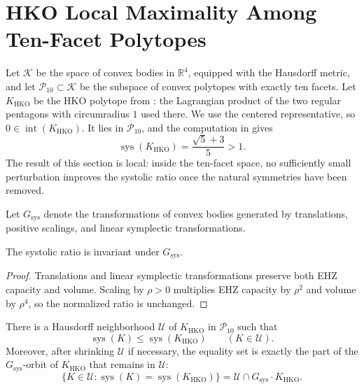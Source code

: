 \clearpage
\section[HKO Local Maximality]{HKO Local Maximality Among Ten-Facet Polytopes}
\label{sec:hko-local-maximum}

Let \(\mathcal K\) be the space of convex bodies in \(\mathbb R^4\), equipped
with the Hausdorff metric, and let \(\mathcal P_{10}\subset\mathcal K\) be the
subspace of convex polytopes with exactly ten facets. Let
\(K_{\mathrm{HKO}}\) be the HKO polytope from
\cite[Proposition~1.3]{HaimKislevOstrover2024}: the Lagrangian product of the
two regular pentagons with circumradius \(1\) used there. We use the centered
representative, so \(0\in\operatorname{int}(K_{\mathrm{HKO}})\). It lies in
\(\mathcal P_{10}\), and the computation in
\cite[Proof of Theorem~1.2]{HaimKislevOstrover2024} gives
\[
  \operatorname{sys}(K_{\mathrm{HKO}})
  =
  \frac{\sqrt{5}+3}{5}
  >1.
\]
The result of this section is local: inside the ten-facet space, no
sufficiently small perturbation improves the systolic ratio once the natural
symmetries have been removed.

\begin{definition}
\label{def:hko-systolic-ratio-symmetries}
Let \(G_{\operatorname{sys}}\) denote the transformations of convex bodies
generated by translations, positive scalings, and linear symplectic
transformations.
\end{definition}

\begin{lemma}
\label{lem:hko-systolic-ratio-invariance}
The systolic ratio is invariant under \(G_{\operatorname{sys}}\).
\end{lemma}

\begin{proof}
Translations and linear symplectic transformations preserve both EHZ capacity
and volume. Scaling by \(\rho>0\) multiplies EHZ capacity by \(\rho^2\) and
volume by \(\rho^4\), so the normalized ratio is unchanged.
\end{proof}


\begin{theorem}
\label{thm:hko-ten-facet-local-maximum}
There is a Hausdorff neighborhood \(\mathcal U\) of \(K_{\mathrm{HKO}}\) in
\(\mathcal P_{10}\) such that
\[
  \operatorname{sys}(K)\leq \operatorname{sys}(K_{\mathrm{HKO}})
  \qquad (K\in\mathcal U).
\]
Moreover, after shrinking \(\mathcal U\) if necessary, the equality set is
exactly the part of the \(G_{\operatorname{sys}}\)-orbit of
\(K_{\mathrm{HKO}}\) that remains in \(\mathcal U\):
\[
  \{K\in\mathcal U:
    \operatorname{sys}(K)=\operatorname{sys}(K_{\mathrm{HKO}})\}
  =
  \mathcal U\cap G_{\operatorname{sys}}\cdot K_{\mathrm{HKO}}.
\]
\end{theorem}

